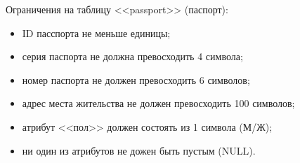 Ограничения на таблицу <<passport>> (паспорт):

\begin{itemize}
  \item ID пасспорта не меньше единицы;
  \item серия паспорта не должна превосходить 4 символа;
  \item номер паспорта не должен превосходить 6 символов;
  \item адрес места жительства не должен превосходить 100 символов;
  \item атрибут <<пол>> должен состоять из 1 символа (М/Ж);
  \item ни один из атрибутов не дожен быть пустым (NULL).
\end{itemize}
